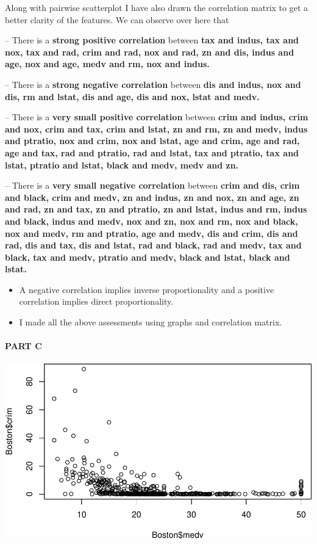 \documentclass[
]{article}
\providecommand{\tightlist}{%
  \setlength{\itemsep}{0pt}\setlength{\parskip}{0pt}}
\begin{document}
Along with pairwise scatterplot I have also drawn the correlation matrix
to get a better clarity of the features. We can observe over here that

-- There is a \textbf{strong positive correlation} between \textbf{tax
and indus, tax and nox, tax and rad, crim and rad, nox and rad, zn and
dis, indus and age, nox and age, medv and rm, nox and indus.}

-- There is a \textbf{strong negative correlation} between \textbf{dis
and indus, nox and dis, rm and lstat, dis and age, dis and nox, lstat
and medv.}

-- There is a \textbf{very small positive correlation} between
\textbf{crim and indus, crim and nox, crim and tax, crim and lstat, zn
and rm, zn and medv, indus and ptratio, nox and crim, nox and lstat, age
and crim, age and rad, age and tax, rad and ptratio, rad and lstat, tax
and ptratio, tax and lstat, ptratio and lstat, black and medv, medv and
zn.}

-- There is a \textbf{very small negative correlation} between
\textbf{crim and dis, crim and black, crim and medv, zn and indus, zn
and nox, zn and age, zn and rad, zn and tax, zn and ptratio, zn and
lstat, indus and rm, indus and black, indus and medv, nox and zn, nox
and rm, nox and black, nox and medv, rm and ptratio, age and medv, dis
and crim, dis and rad, dis and tax, dis and lstat, rad and black, rad
and medv, tax and black, tax and medv, ptratio and medv, black and
lstat, black and lstat.}

\begin{itemize}
\tightlist
\item
  A negative correlation implies inverse proportionality and a positive
  correlation implies direct proportionality.
\item
  I made all the above assessments using graphs and correlation matrix.
\end{itemize}

\pagebreak

\hypertarget{part-c}{%
\paragraph{PART C}\label{part-c}}

\begin{center}\includegraphics{Disha_Gandhi_Take_Home_Exam_PDF_files/figure-latex/unnamed-chunk-3-1} \end{center}
\end{document}
